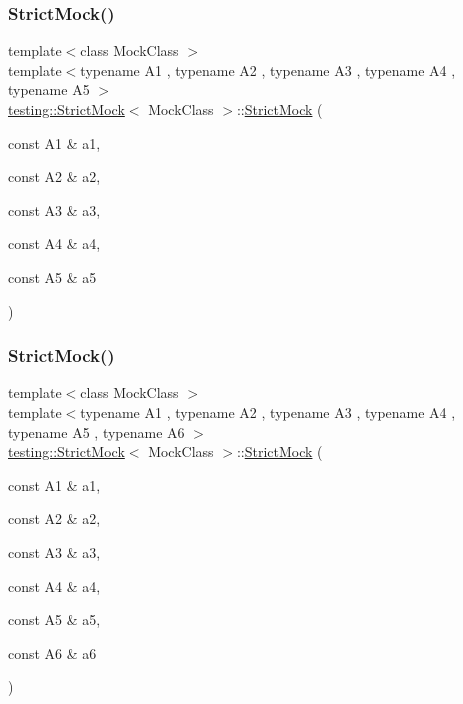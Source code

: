 \mbox{\label{classtesting_1_1_strict_mock_a2019f4e86224b2adbb9e9326bc175c50}} 
\subsubsection{\texorpdfstring{Strict\+Mock()}{StrictMock()}\hspace{0.1cm}{\footnotesize\ttfamily [6/11]}}
{\footnotesize\ttfamily template$<$class Mock\+Class $>$ \\
template$<$typename A1 , typename A2 , typename A3 , typename A4 , typename A5 $>$ \\
\hyperlink{classtesting_1_1_strict_mock}{testing\+::\+Strict\+Mock}$<$ Mock\+Class $>$\+::\hyperlink{classtesting_1_1_strict_mock}{Strict\+Mock} (\begin{DoxyParamCaption}\item[{const A1 \&}]{a1,  }\item[{const A2 \&}]{a2,  }\item[{const A3 \&}]{a3,  }\item[{const A4 \&}]{a4,  }\item[{const A5 \&}]{a5 }\end{DoxyParamCaption})\hspace{0.3cm}{\ttfamily [inline]}}

\mbox{\label{classtesting_1_1_strict_mock_a17b452e1e2f57d7d10f7209587376eef}} 
\subsubsection{\texorpdfstring{Strict\+Mock()}{StrictMock()}\hspace{0.1cm}{\footnotesize\ttfamily [7/11]}}
{\footnotesize\ttfamily template$<$class Mock\+Class $>$ \\
template$<$typename A1 , typename A2 , typename A3 , typename A4 , typename A5 , typename A6 $>$ \\
\hyperlink{classtesting_1_1_strict_mock}{testing\+::\+Strict\+Mock}$<$ Mock\+Class $>$\+::\hyperlink{classtesting_1_1_strict_mock}{Strict\+Mock} (\begin{DoxyParamCaption}\item[{const A1 \&}]{a1,  }\item[{const A2 \&}]{a2,  }\item[{const A3 \&}]{a3,  }\item[{const A4 \&}]{a4,  }\item[{const A5 \&}]{a5,  }\item[{const A6 \&}]{a6 }\end{DoxyParamCaption})\hspace{0.3cm}{\ttfamily [inline]}}

